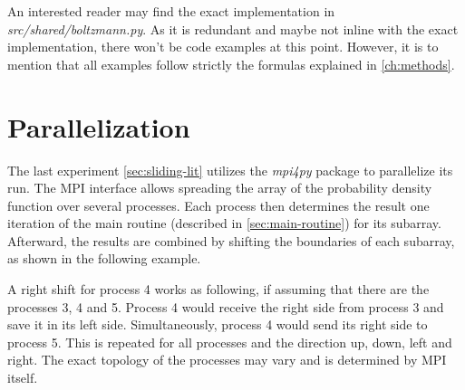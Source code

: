 An interested reader may find the exact implementation in \textit{src/shared/boltzmann.py}.
As it is redundant and maybe not inline with the exact implementation, there won't be code examples at this point.
However, it is to mention that all examples follow strictly the formulas explained in \cref{ch:methods}.


\section{Parallelization}\label{sec:parallelization}
The last experiment \cref{sec:sliding-lit} utilizes the \textit{mpi4py} package to parallelize its run.
The MPI interface allows spreading the array of the probability density function over several processes.
Each process then determines the result one iteration of the main routine (described in \cref{sec:main-routine}) for its subarray.
Afterward, the results are combined by shifting the boundaries of each subarray, as shown in the following example.
\newline

A right shift for process 4 works as following, if assuming that there are the processes 3, 4 and 5.
Process 4 would receive the right side from process 3 and save it in its left side.
Simultaneously, process 4 would send its right side to process 5.
This is repeated for all processes and the direction up, down, left and right.
The exact topology of the processes may vary and is determined by MPI itself.
